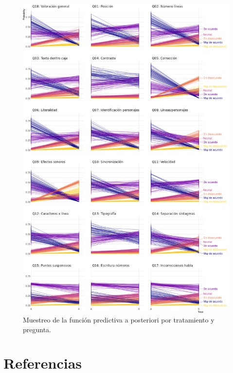 \documentclass[
  12pt,
  a4paper,
  extrafontsizes,
  onecolumn,
  openright,
  table]{memoir}
\begin{document}
\begin{figure}[h]

{\centering \includegraphics[width=1\textwidth,height=\textheight]{images/bayes-preg.png}

}

\caption{\label{fig-pred-3}Muestreo de la función predictiva a
posteriori por tratamiento y pregunta.}

\end{figure}


\hypertarget{referencias}{%
\chapter*{Referencias}\label{referencias}}
\end{document}
